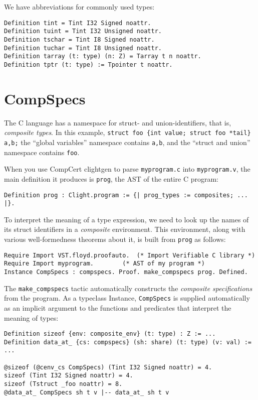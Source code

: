 \documentclass[12pt,fleqn,openany,oneside,showtrims]{memoir}
\begin{document}
We have abbreviations for commonly used types:
\begin{lstlisting}
Definition tint = Tint I32 Signed noattr.
Definition tuint = Tint I32 Unsigned noattr.
Definition tschar = Tint I8 Signed noattr.
Definition tuchar = Tint I8 Unsigned noattr.
Definition tarray (t: type) (n: Z) = Tarray t n noattr.
Definition tptr (t: type) := Tpointer t noattr.
\end{lstlisting}


\chapter{CompSpecs}
\label{refcard:compspecs}

The C language has a namespace for struct- and union-identifiers,
that is, \emph{composite types}.
In this example,
\lstinline|struct foo {int value; struct foo *tail}  a,b;|
the ``global variables'' namespace contains
\lstinline{a,b}, and the ``struct and union'' namespace
contains \lstinline{foo}.

When you use CompCert clightgen to
parse \lstinline{myprogram.c} into \lstinline{myprogram.v},
the main definition it produces is
\lstinline{prog}, the AST of the entire
C program:
\begin{lstlisting}
Definition prog : Clight.program := {| prog_types := composites; ... |}.
\end{lstlisting}
To interpret the meaning of a type expression, we need
to look up the names of its struct identifiers
in a \emph{composite} environment.  This environment,
along with various well-formedness theorems about it,
is built from \lstinline{prog} as follows:

\begin{lstlisting}
Require Import VST.floyd.proofauto.  (* Import Verifiable C library *)
Require Import myprogram.        (* AST of my program *)
Instance CompSpecs : compspecs. Proof. make_compspecs prog. Defined.
\end{lstlisting}
The \lstinline{make_compspecs} tactic automatically constructs
the \emph{composite specifications} from the program.
As a typeclass Instance, \lstinline{CompSpecs} is
supplied automatically as an implicit
argument to the functions and predicates that
interpret the meaning of types:

\begin{lstlisting}
Definition sizeof {env: composite_env} (t: type) : Z := ...
Definition data_at_ {cs: compspecs} (sh: share) (t: type) (v: val) := ...

@sizeof (@cenv_cs CompSpecs) (Tint I32 Signed noattr) = 4.
sizeof (Tint I32 Signed noattr) = 4.
sizeof (Tstruct _foo noattr) = 8.
@data_at_ CompSpecs sh t v |-- data_at_ sh t v
\end{lstlisting}
\end{document}
